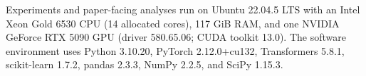 Experiments and paper-facing analyses run on Ubuntu 22.04.5 LTS with an Intel Xeon Gold 6530 CPU (14 allocated cores), 117 GiB RAM, and one NVIDIA GeForce RTX 5090 GPU (driver 580.65.06; CUDA toolkit 13.0). The software environment uses Python 3.10.20, PyTorch 2.12.0+cu132, Transformers 5.8.1, scikit-learn 1.7.2, pandas 2.3.3, NumPy 2.2.5, and SciPy 1.15.3.
